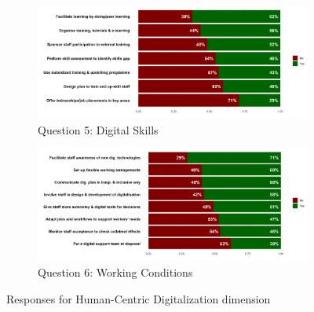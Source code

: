 \documentclass[12pt]{report}
\begin{document}
\begin{figure}
    \centering
    \begin{subfigure}[b]{0.8\textwidth}
        \centering
        \includegraphics[width=\linewidth]{../Output/q5.png}
        \caption{Question 5: Digital Skills}
    \end{subfigure}
    \vfill
    \begin{subfigure}[b]{0.8\textwidth}
        \centering
        \includegraphics[width=\linewidth]{../Output/q6.png}
        \caption{Question 6: Working Conditions}
    \end{subfigure}
    \caption{Responses for Human-Centric Digitalization dimension}
\end{figure}
\end{document}
